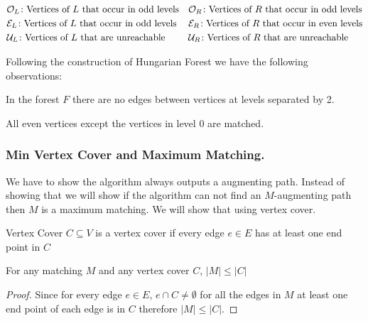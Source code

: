 \begin{align*}
	&\mathcal{O}_L\colon\text{Vertices of $L$ that occur in odd levels}&& \mathcal{O}_R\colon\text{Vertices of $R$ that occur in odd levels}\\
	&\mathcal{E}_L\colon\text{Vertices of $L$ that occur in odd levels}&& \mathcal{E}_R\colon\text{Vertices of $R$ that occur in even levels}\\
	&\mathcal{U}_L\colon\text{Vertices of $L$ that are unreachable}&& \mathcal{U}_R\colon\text{Vertices of $R$ that are unreachable}
\end{align*}


Following the construction of Hungarian Forest we have the following observations:

\begin{observation}
	In the forest $F$ there are no edges between vertices at levels separated by 2. 
\end{observation}
\begin{observation}\label{evens-matched}
	All even vertices except the vertices in level 0 are matched.
\end{observation}

\subsubsection{Min Vertex Cover and Maximum Matching.}
We have to  show the algorithm always outputs a augmenting path. Instead of showing that we will show if the algorithm can not find an $M$-augmenting path then $M$ is a maximum matching. We will show that using vertex cover.

\begin{Definition}{Vertex Cover}{}
	$C\subseteq V$ is a vertex cover if every edge $e\in E$ has at least one end point in $C$
\end{Definition}
\begin{lemma}{}{}
	For any matching $M$ and any vertex cover $C$, $|M|\leq |C|$
\end{lemma}
\begin{proof}
	Since for every edge $e\in E$, $e\cap C\neq \emptyset$ for all the edges in $M$ at least one end point of each edge is in $C$ therefore $|M|\leq |C|$.
\end{proof}

